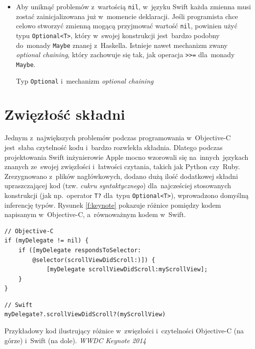 \documentclass[mgr, shortabstract]{iithesis}
\newcommand{\swiftlisting}[2]{
    \swiftcode{src/#1.swift}
    \begin{listing}[ht]
      \caption{#2}
      \label{l:#1}
    \end{listing}
}
\begin{document}
\begin{itemize}
    \item Aby uniknąć problemów z~wartością \texttt{nil}, w~języku Swift każda zmienna musi zostać zainicjalizowana już w~momencie deklaracji. Jeśli programista chce celowo stworzyć zmienną mogącą przyjmować wartość \texttt{nil}, powinien użyć typu \texttt{Optional<T>}, który w~swojej konstrukcji jest~bardzo podobny do~monady \texttt{Maybe} znanej z~Haskella. Istnieje nawet mechanizm zwany \textit{optional chaining}, który zachowuje się tak, jak operacja \texttt{>>=} dla~monady \texttt{Maybe}.

    \swiftlisting
        {2_optional}
        {Typ \texttt{Optional} i~mechanizm \textit{optional chaining}}

\end{itemize}

\section{Zwięzłość składni}
\label{s:zwiezlosc_skladni}

Jednym z~największych problemów podczas programowania w~Objective-C jest~słaba czytelność kodu i~bardzo rozwlekła składnia. Dlatego podczas projektowania Swift inżynierowie Apple mocno wzorowali się na~innych~językach znanych ze~swojej zwięzłości i~łatwości czytania, takich jak Python czy~Ruby. Zrezygnowano z~plików nagłówkowych, dodano dużą ilość dodatkowej składni upraszczającej kod (tzw. \textit{cukru syntaktycznego}) dla~najcześciej stosowanych konstrukcji (jak np.~operator \texttt{T?} dla~typu \texttt{Optional<T>}), wprowadzono domyślną inferencję typów. Rysunek \ref{f:keynote} pokazuje różnice pomiędzy kodem napisanym w~Objective-C, a~równoważnym kodem w~Swift.

\begin{listing}[ht]
\begin{verbatim}
// Objective-C
if (myDelegate != nil) {
    if ([myDelegate respondsToSelector:
        @selector(scrollViewDidScroll:)]) {
            [myDelegate scrollViewDidScroll:myScrollView];
    }
}
\end{verbatim}

\begin{verbatim}
// Swift
myDelegate?.scrollViewDidScroll?(myScrollView)
\end{verbatim}
\caption{Przykładowy kod ilustrujący różnice w~zwięzłości i~czytelności Objective-C (na górze) i~Swift (na dole). \textit{WWDC Keynote 2014}}
\label{f:keynote}
\end{listing}
\end{document}
